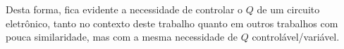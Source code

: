 \documentclass[
	article,			%
	11pt,				%
	oneside,			%
	a4paper,			%
	twocolumn,
	english,			%
	brazil,				%
	sumario=tradicional
	]{abntex2}
\begin{document}




Desta forma, fica evidente a necessidade de controlar o $Q$ de um circuito eletrônico, tanto no contexto deste trabalho quanto em outros trabalhos com pouca similaridade, mas com a mesma necessidade de $Q$ controlável/variável. 
\end{document}
